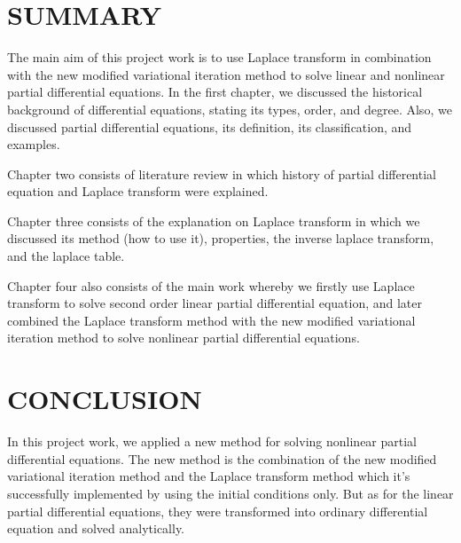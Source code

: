 \documentclass[12pt]{report}
\begin{document}
\section{SUMMARY}
\qquad The main aim of this project work is to use Laplace transform in combination with the new modified variational iteration method to solve linear and nonlinear partial differential equations. In the first chapter, we discussed the historical background of differential equations, stating its types, order, and degree. Also, we discussed partial differential equations, its definition, its classification, and examples. 
\par Chapter two consists of literature review in which history of partial differential equation and Laplace transform were explained.
\par Chapter three consists of the explanation on Laplace transform in which we discussed its method (how to use it), properties, the inverse laplace transform, and the laplace table. 
\par Chapter four also consists of the main work whereby we firstly use Laplace transform to solve second order linear partial differential equation, and later combined the Laplace transform method with the new modified variational iteration method to solve nonlinear partial differential equations.
\section{CONCLUSION}
\qquad In this project work, we applied a new method for solving nonlinear partial differential equations. The new method is the combination of the new modified variational iteration method and the Laplace transform method which it's successfully implemented by using the initial conditions only. But as for the linear partial differential equations, they were transformed into ordinary differential equation and solved analytically.


\newpage
\end{document}
